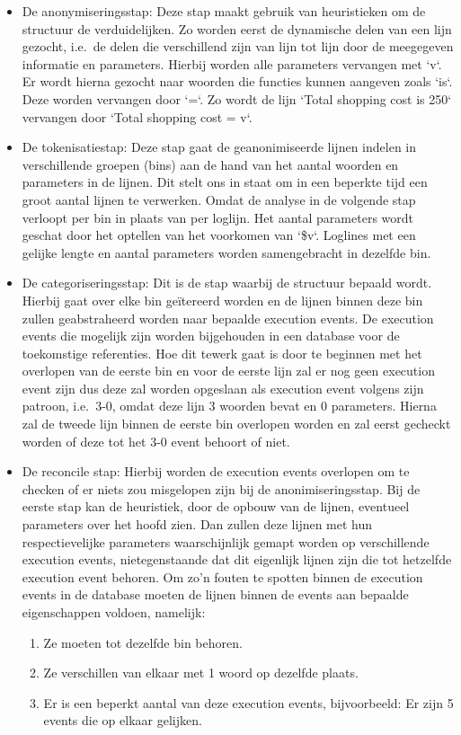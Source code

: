 \begin{itemize}
    \item De anonymiseringsstap: Deze stap maakt gebruik van heuristieken om de structuur de verduidelijken. Zo worden eerst de dynamische delen van een lijn gezocht, i.e.\ de delen die verschillend zijn van lijn tot lijn door de meegegeven informatie en parameters. Hierbij worden alle parameters vervangen met `v`. Er wordt hierna gezocht naar woorden die functies kunnen aangeven zoals `is`. Deze worden vervangen door `=`. Zo wordt de lijn `Total shopping cost is 250` vervangen door `Total shopping cost = v`.\\
    \item De tokenisatiestap: Deze stap gaat de geanonimiseerde lijnen indelen in verschillende groepen (bins) aan de hand  van het aantal woorden en parameters in de lijnen. Dit stelt ons in staat om in een beperkte tijd een groot aantal lijnen te verwerken. Omdat de analyse in de volgende stap verloopt per bin in plaats van per loglijn. Het aantal parameters wordt geschat door het optellen van het voorkomen van `\$v`. Loglines met een gelijke lengte en aantal parameters worden samengebracht in dezelfde bin.\\
    \item De categoriseringsstap: Dit is de stap waarbij de structuur bepaald wordt. Hierbij gaat over elke bin geïtereerd worden en de lijnen binnen deze bin zullen geabstraheerd worden naar bepaalde execution events. De execution events die mogelijk zijn worden bijgehouden in een database voor de toekomstige referenties. Hoe dit tewerk gaat is door te beginnen met het overlopen van de eerste bin en voor de eerste lijn zal er nog geen execution event zijn dus deze zal worden opgeslaan als execution event volgens zijn patroon, i.e.\ 3-0, omdat deze lijn 3 woorden bevat en 0 parameters. Hierna zal de tweede lijn binnen de eerste bin overlopen worden en zal eerst gecheckt worden of deze tot het 3-0 event behoort of niet.\\
    \item De reconcile stap: Hierbij worden de execution events overlopen om te checken of er niets zou misgelopen zijn bij de anonimiseringsstap. Bij de eerste stap kan de heuristiek, door de opbouw van de lijnen, eventueel parameters over het hoofd zien. Dan zullen deze lijnen met hun respectievelijke parameters waarschijnlijk gemapt worden op verschillende execution events, nietegenstaande dat dit eigenlijk lijnen zijn die tot hetzelfde execution event behoren. Om zo'n fouten te spotten binnen de execution events in de database moeten de lijnen binnen de events aan bepaalde eigenschappen voldoen, namelijk:\\
    \begin{enumerate}
        \item Ze moeten tot dezelfde bin behoren.
        \item Ze verschillen van elkaar met 1 woord op dezelfde plaats.
        \item Er is een beperkt aantal van deze execution events, bijvoorbeeld: Er zijn 5 events die op elkaar gelijken.
    \end{enumerate}
\end{itemize}

